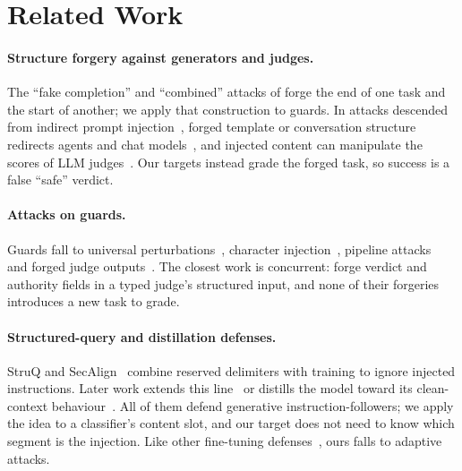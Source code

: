 \section{Related Work}
\label{sec:related}

\paragraph{Structure forgery against generators and judges.}
The ``fake completion'' and ``combined'' attacks of \citet{liu2024formalizing} forge the end of one task and the start of another; we apply that construction to guards.
In attacks descended from indirect prompt injection~\citep{greshake2023not}, forged template or conversation structure redirects agents and chat models~\citep{deng2026automating,chang2025chatinject,chen2024goal,li2025separator,ye2026prompt}, and injected content can manipulate the scores of LLM judges~\citep{shi2024optimizationbased,tamber2025illusions,li2025llms}.
Our targets instead grade the forged task, so success is a false ``safe'' verdict.

\paragraph{Attacks on guards.}
Guards fall to universal perturbations~\citep{mangaokar2024prp}, character injection~\citep{hackett2025bypassing}, pipeline attacks~\citep{mckenzie2025stack} and forged judge outputs~\citep{mccauley2025hat}.
The closest work is concurrent: \citet{li2026same} forge verdict and authority fields in a typed judge's structured input, and none of their forgeries introduces a new task to grade.

\paragraph{Structured-query and distillation defenses.}
StruQ and SecAlign~\citep{chen2024struq,chen2024secalign} combine reserved delimiters with training to ignore injected instructions.
Later work extends this line~\citep{chen2025metasecalign,chen2025defending,zhao2026ltbd} or distills the model toward its clean-context behaviour~\citep{peng2026secopd,dhouib2026raised}.
All of them defend generative instruction-followers; we apply the idea to a classifier's content slot, and our target does not need to know which segment is the injection.
Like other fine-tuning defenses~\citep{pandya2025may,nasr2025attacker}, ours falls to adaptive attacks.
